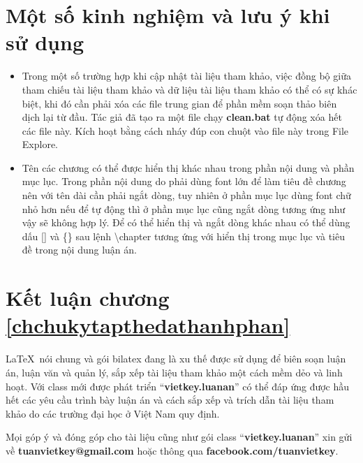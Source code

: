 \section{\bf Một số kinh nghiệm và lưu ý khi sử dụng}
\begin{itemize}
	\item Trong một số trường hợp khi cập nhật tài liệu tham khảo, việc đồng bộ giữa tham chiếu tài liệu tham khảo và dữ liệu tài liệu tham khảo có thể có sự khác biệt, khi đó cần phải xóa các file trung gian để phần mềm soạn thảo biên dịch lại từ đầu. Tác giả đã tạo ra một file chạy \textbf{clean.bat} tự động xóa hết các file này. Kích hoạt bằng cách nháy đúp con chuột vào file này trong File Explore.
	\item Tên các chương có thể được hiển thị khác nhau trong phần nội dung và phần mục lục. Trong phần nội dung do phải dùng font lớn để làm tiêu đề chương nên với tên dài cần phải ngắt dòng, tuy nhiên ở phần mục lục dùng font chữ nhỏ hơn nếu để tự động thì ở phần mục lục cũng ngắt dòng tương ứng như vậy sẽ không hợp lý. Để có thể hiển thị và ngắt dòng khác nhau có thể dùng dấu [] và \{\} sau lệnh \textbackslash chapter tương ứng với hiển thị trong mục lục và tiêu đề trong nội dung luận án.
\end{itemize}

\section{\bf Kết luận chương \ref{chchukytapthedathanhphan}}

\LaTeX\ nói chung và gói bilatex đang là xu thế được sử dụng để biên soạn luận án, luận văn và quản lý, sắp xếp tài liệu tham khảo một cách mềm dẻo và linh hoạt. Với class mới được phát triển ``\textbf{vietkey.luanan}'' có thể đáp ứng được hầu hết các yêu cầu trình bày luận án và cách sắp xếp và trích dẫn tài liệu tham khảo do các trường đại học ở Việt Nam quy định.

Mọi góp ý và đóng góp cho tài liệu cũng như gói class ``\textbf{vietkey.luanan}'' xin gửi về \textbf{tuanvietkey@gmail.com} hoặc thông qua \textbf{facebook.com/tuanvietkey}.

